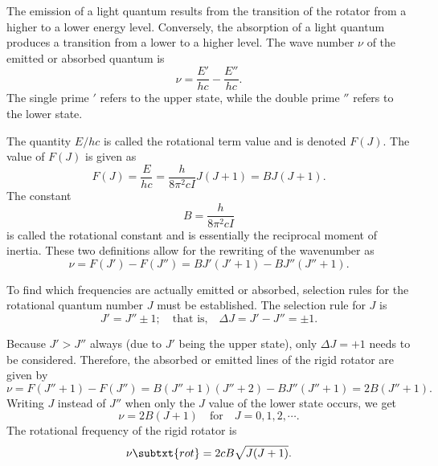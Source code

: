 The emission of a light quantum results from the transition of the rotator from a higher to a lower energy level. Conversely, the absorption of a light quantum produces a transition from a lower to a higher level. The wave number $\nu$ of the emitted or absorbed quantum is
\begin{equation*}
    \nu = \frac{E'}{hc} - \frac{E''}{hc}.
\end{equation*}
The single prime $'$ refers to the upper state, while the double prime $''$ refers to the lower state.

The quantity $E/hc$ is called the rotational term value and is denoted $F(J)$. The value of $F(J)$ is given as
\begin{equation*}
    F(J) = \frac{E}{hc} = \frac{h}{8\pi^2cI}J(J + 1) = BJ(J + 1).
\end{equation*}
The constant
\begin{equation*}
    B = \frac{h}{8\pi^2cI}
\end{equation*}
is called the rotational constant and is essentially the reciprocal moment of inertia. These two definitions allow for the rewriting of the wavenumber as
\begin{equation*}
    \nu = F(J')- F(J'') = BJ'(J' + 1) - BJ''(J'' + 1).
\end{equation*}

To find which frequencies are actually emitted or absorbed, selection rules for the rotational quantum number $J$ must be established. The selection rule for $J$ is
\begin{equation*}
    J' = J'' \pm 1; \quad\text{that is,}\quad \Delta{}J = J' - J'' = \pm 1.
\end{equation*}

Because $J' > J''$ always (due to $J'$ being the upper state), only $\Delta{}J = +1$ needs to be considered. Therefore, the absorbed or emitted lines of the rigid rotator are given by
\begin{equation*}
    \nu = F(J'' + 1) - F(J'') = B(J'' + 1)(J'' + 2) - BJ''(J'' + 1) = 2B(J'' + 1).
\end{equation*}
Writing $J$ instead of $J''$ when only the $J$ value of the lower state occurs, we get
\begin{equation*}
    \nu = 2B(J + 1) \quad\text{for}\quad J = 0, 1, 2, \dotsb.
\end{equation*}
The rotational frequency of the rigid rotator is
\begin{equation*}
    \nu\subtxt{rot} = 2cB\sqrt{J(J + 1)}.
\end{equation*}

